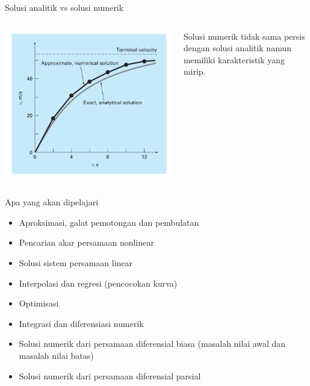 \begin{frame}{Solusi analitik vs solusi numerik}

\begin{columns}[T]

\begin{column}{0.5\textwidth}
{\centering
\includegraphics[height=0.8\textheight]{../chapra_7th/Chapra_Fig_1_5.png}
\par}
\end{column}

\begin{column}{0.5\textwidth}
Solusi numerik tidak sama persis dengan solusi analitik namun memiliki
karakteristik yang mirip.
\end{column}

\end{columns}

\end{frame}



\begin{frame}{Apa yang akan dipelajari}

\begin{itemize}
\item Aproksimasi, galat pemotongan dan pembulatan
\item Pencarian akar persamaan nonlinear
\item Solusi sistem persamaan linear
\item Interpolasi dan regresi (pencocokan kurva)
\item Optimisasi
\item Integrasi dan diferensiasi numerik
\item Solusi numerik dari persamaan diferensial biasa (masalah nilai
awal dan masalah nilai batas)
\item Solusi numerik dari persamaan diferensial parsial
\end{itemize}

\end{frame}



